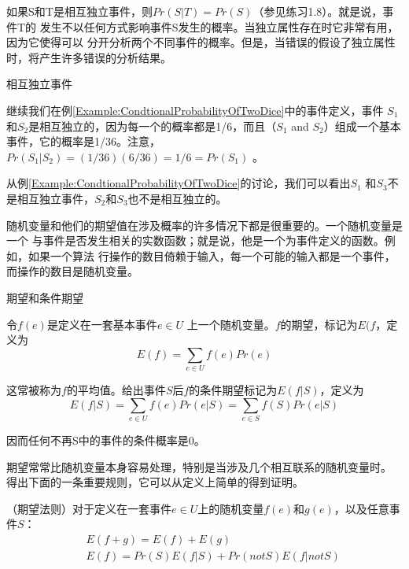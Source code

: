 如果S和T是相互独立事件，则$Pr(S|T)=Pr(S)$（参见练习1.8）。就是说，事件T的
发生不以任何方式影响事件S发生的概率。当独立属性存在时它非常有用，因为它使得可以
分开分析两个不同事件的概率。但是，当错误的假设了独立属性时，将产生许多错误的分析结果。

\begin{example}
相互独立事件

继续我们在例\ref{Example:CondtionalProbabilityOfTwoDice}中的事件定义，事件
$S_1$和$S_2$是相互独立的，因为每一个的概率都是1/6，而且（$S_1$ and
$S_2$）组成一个基本事件，它的概率是1/36。注意，$Pr(S_1|S_2)=(1/36)(6/36)=1/6=Pr(S_1)$
。

从例\ref{Example:CondtionalProbabilityOfTwoDice}的讨论，我们可以看出$S_1$
和$S_3$不是相互独立事件，$S_2$和$S_3$也不是相互独立的。

\end{example}

随机变量和他们的期望值在涉及概率的许多情况下都是很重要的。一个随机变量是一个
与事件是否发生相关的实数函数；就是说，他是一个为事件定义的函数。例如，如果一个算法
行操作的数目倚赖于输入，每一个可能的输入都是一个事件，而操作的数目是随机变量。

\begin{definition}
期望和条件期望

令$f(e)$是定义在一套基本事件$e\in U$
上一个随机变量。$f$的期望，标记为$E(f$，定义为
    \begin{displaymath}
        E(f)=\sum_{e\in U}f(e)Pr(e)
    \end{displaymath}

这常被称为$f$的平均值。给出事件$S$后$f$的条件期望标记为$E(f|S)$，定义为
    \begin{displaymath}
        E(f|S)=\sum_{e\in U}f(e)Pr(e|S)=\sum_{e\in S}f(S)Pr(e|S)
    \end{displaymath}

因而任何不再S中的事件的条件概率是0。
\end{definition}

期望常常比随机变量本身容易处理，特别是当涉及几个相互联系的随机变量时。
得出下面的一条重要规则，它可以从定义上简单的得到证明。

\begin{lemma}\label{Lemma:ExceptionLaw}
    （期望法则）对于定义在一套事件$e\in U$上的随机变量$f(e)$和$g(e)$，以及任意事件$S$：
    \begin{eqnarray*}
    && E(f+g)=E(f)+E(g)\\
    && E(f)=Pr(S)E(f|S) + Pr(not S)E(f|not S)
    \end{eqnarray*}
\end{lemma}

